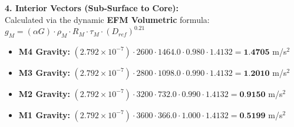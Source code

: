 \documentclass[11pt, a4paper]{article}
\begin{document}
  \vspace{0.5em}
  \noindent \textbf{4. Interior Vectors (Sub-Surface to Core):} \\[0.5em]
  \hspace*{1em} Calculated via the dynamic \textbf{EFM Volumetric} formula: $g_M = (\alpha G) \cdot \rho_{M} \cdot R_M \cdot \tau_M \cdot (D_{ref})^{0.21}$
  \begin{itemize}
    \item \textbf{M4 Gravity:} $(2.792 \times 10^{-7}) \cdot 2600 \cdot 1464.0 \cdot 0.980 \cdot 1.4132 = \textbf{1.4705}$ m/s$^2$
    \item \textbf{M3 Gravity:} $(2.792 \times 10^{-7}) \cdot 2800 \cdot 1098.0 \cdot 0.990 \cdot 1.4132 = \textbf{1.2010}$ m/s$^2$
    \item \textbf{M2 Gravity:} $(2.792 \times 10^{-7}) \cdot 3200 \cdot 732.0 \cdot 0.990 \cdot 1.4132 = \textbf{0.9150}$ m/s$^2$
    \item \textbf{M1 Gravity:} $(2.792 \times 10^{-7}) \cdot 3600 \cdot 366.0 \cdot 1.000 \cdot 1.4132 = \textbf{0.5199}$ m/s$^2$
  \end{itemize}
\end{document}

